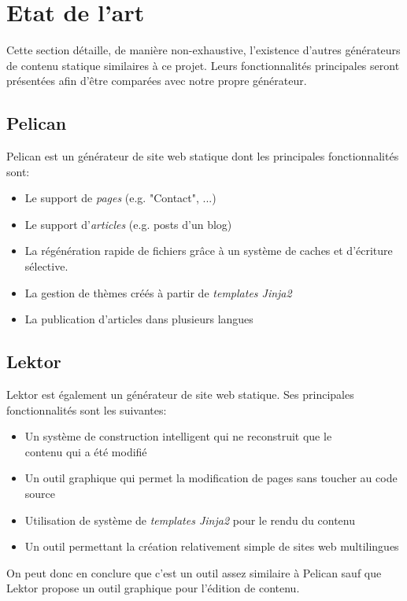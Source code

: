 \section{Etat de l'art}
	
	Cette section détaille, de manière non-exhaustive, l'existence d'autres générateurs de contenu statique similaires à ce projet. Leurs fonctionnalités principales seront présentées afin d'être comparées avec notre propre générateur.
	
	\subsection*{Pelican}
	Pelican \cite{Pelican} est un générateur de site web statique dont les principales fonctionnalités sont:
	\begin{itemize}
		\item Le support de \textit{pages} (e.g. "Contact", ...)
		\item Le support d'\textit{articles} (e.g. posts d'un blog)
		\item La régénération rapide de fichiers grâce à un système de caches et d'écriture sélective.
		\item La gestion de thèmes créés à partir de \textit{templates Jinja2}
		\item La publication d'articles dans plusieurs langues
	\end{itemize}
	
	\subsection*{Lektor}
	Lektor \cite{Lektor} est également un générateur de site web statique. Ses principales fonctionnalités sont les suivantes:
	
	\begin{itemize}
		\item Un système de construction intelligent qui ne reconstruit que le \\contenu qui a été modifié
		\item Un outil graphique qui permet la modification de pages sans toucher au code source
		\item Utilisation de système de \textit{templates Jinja2} pour le rendu du contenu
		\item Un outil permettant la création relativement simple de sites web multilingues
	\end{itemize}
	
	On peut donc en conclure que c'est un outil assez similaire à Pelican sauf que Lektor propose un outil graphique pour l'édition de contenu.
	
